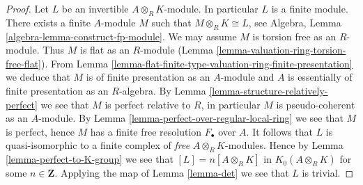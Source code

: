 \documentclass[10pt,a4paper]{amsart}
\theoremstyle{plain}
\theoremstyle{definition}
\theoremstyle{remark}
\numberwithin{equation}{subsection}
\begin{document}
\begin{proof}
Let $L$ be an invertible $A \otimes_R K$-module. In particular $L$ is
a finite module. There exists a finite $A$-module
$M$ such that $M \otimes_R K \cong L$, see
Algebra, Lemma \ref{algebra-lemma-construct-fp-module}.
We may assume $M$ is torsion free as an $R$-module.
Thus $M$ is flat as an $R$-module
(Lemma \ref{lemma-valuation-ring-torsion-free-flat}).
From Lemma \ref{lemma-flat-finite-type-valuation-ring-finite-presentation}
we deduce that $M$ is of finite presentation as an $A$-module
and $A$ is essentially of finite presentation as an $R$-algebra.
By Lemma \ref{lemma-structure-relatively-perfect}
we see that $M$ is perfect relative to $R$,
in particular $M$ is pseudo-coherent as an $A$-module.
By Lemma \ref{lemma-perfect-over-regular-local-ring}
we see that $M$ is perfect, hence
$M$ has a finite free resolution $F_\bullet$ over $A$.
It follows that $L$ is quasi-isomorphic to a finite complex
of {\it free} $A \otimes_R K$-modules. Hence by
Lemma \ref{lemma-perfect-to-K-group} we see that
$[L] = n[A \otimes_R K]$ in $K_0(A \otimes_R K)$
for some $n \in \mathbf{Z}$.
Applying the map of Lemma \ref{lemma-det}
we see that $L$ is trivial.
\end{proof}
\end{document}
